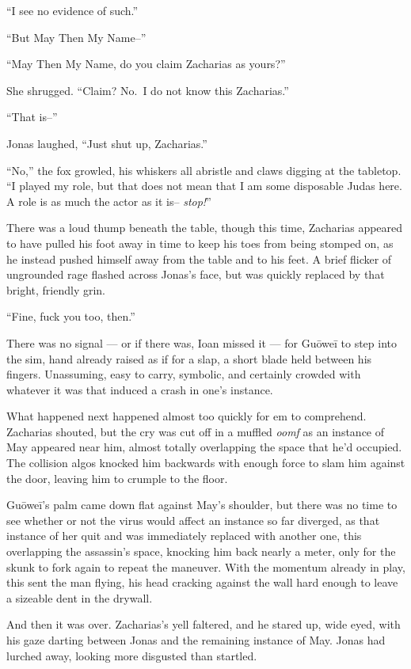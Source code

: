 ``I see no evidence of such.''

``But May Then My Name--''

``May Then My Name, do you claim Zacharias as yours?''

She shrugged. ``Claim? No.~I do not know this Zacharias.''

``That is--''

Jonas laughed, ``Just shut up, Zacharias.''

``No,'' the fox growled, his whiskers all abristle and claws digging at the tabletop. ``I played my role, but that does not mean that I am some disposable Judas here. A role is as much the actor as it is-- \emph{stop!}''

There was a loud thump beneath the table, though this time, Zacharias appeared to have pulled his foot away in time to keep his toes from being stomped on, as he instead pushed himself away from the table and to his feet. A brief flicker of ungrounded rage flashed across Jonas's face, but was quickly replaced by that bright, friendly grin.

``Fine, fuck you too, then.''

There was no signal — or if there was, Ioan missed it — for Guōweī to step into the sim, hand already raised as if for a slap, a short blade held between his fingers. Unassuming, easy to carry, symbolic, and certainly crowded with whatever it was that induced a crash in one's instance.

What happened next happened almost too quickly for em to comprehend. Zacharias shouted, but the cry was cut off in a muffled \emph{oomf} as an instance of May appeared near him, almost totally overlapping the space that he'd occupied. The collision algos knocked him backwards with enough force to slam him against the door, leaving him to crumple to the floor.

Guōweī's palm came down flat against May's shoulder, but there was no time to see whether or not the virus would affect an instance so far diverged, as that instance of her quit and was immediately replaced with another one, this overlapping the assassin's space, knocking him back nearly a meter, only for the skunk to fork again to repeat the maneuver. With the momentum already in play, this sent the man flying, his head cracking against the wall hard enough to leave a sizeable dent in the drywall.

And then it was over. Zacharias's yell faltered, and he stared up, wide eyed, with his gaze darting between Jonas and the remaining instance of May. Jonas had lurched away, looking more disgusted than startled.

